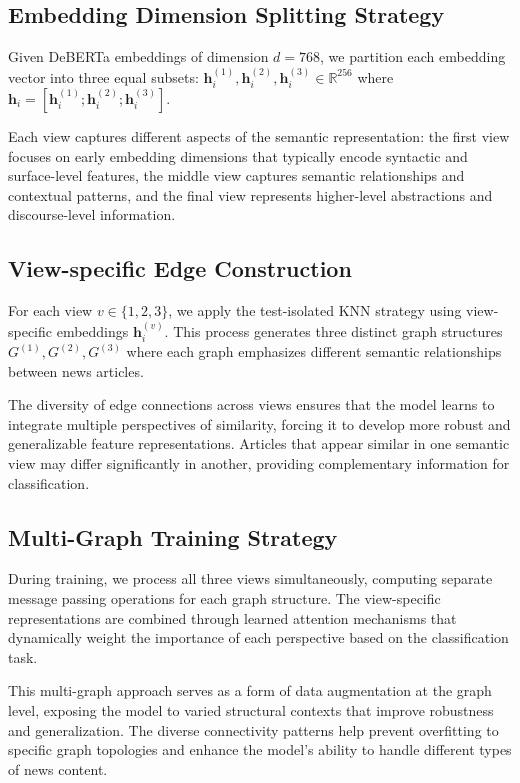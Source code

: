 \subsection{Embedding Dimension Splitting Strategy}

Given DeBERTa embeddings of dimension $d = 768$, we partition each embedding vector into three equal subsets: $\mathbf{h}_i^{(1)}, \mathbf{h}_i^{(2)}, \mathbf{h}_i^{(3)} \in \mathbb{R}^{256}$ where $\mathbf{h}_i = [\mathbf{h}_i^{(1)}; \mathbf{h}_i^{(2)}; \mathbf{h}_i^{(3)}]$.

Each view captures different aspects of the semantic representation: the first view focuses on early embedding dimensions that typically encode syntactic and surface-level features, the middle view captures semantic relationships and contextual patterns, and the final view represents higher-level abstractions and discourse-level information.

\subsection{View-specific Edge Construction}

For each view $v \in \{1, 2, 3\}$, we apply the test-isolated KNN strategy using view-specific embeddings $\mathbf{h}_i^{(v)}$. This process generates three distinct graph structures $G^{(1)}, G^{(2)}, G^{(3)}$ where each graph emphasizes different semantic relationships between news articles.

The diversity of edge connections across views ensures that the model learns to integrate multiple perspectives of similarity, forcing it to develop more robust and generalizable feature representations. Articles that appear similar in one semantic view may differ significantly in another, providing complementary information for classification.

\subsection{Multi-Graph Training Strategy}

During training, we process all three views simultaneously, computing separate message passing operations for each graph structure. The view-specific representations are combined through learned attention mechanisms that dynamically weight the importance of each perspective based on the classification task.

This multi-graph approach serves as a form of data augmentation at the graph level, exposing the model to varied structural contexts that improve robustness and generalization. The diverse connectivity patterns help prevent overfitting to specific graph topologies and enhance the model's ability to handle different types of news content.

